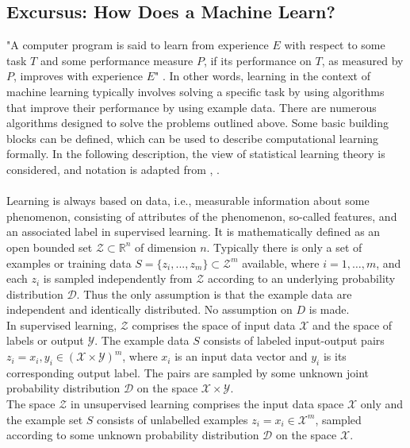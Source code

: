 \begin{tcolorbox}
    \subsection*{Excursus: How Does a Machine Learn?}
    "A computer program is said to learn from experience $E$ with respect to some task $T$ and some performance measure $P$, if its performance on $T$, as measured by $P$, improves with experience $E$" \cite{Mitchell1997}. In other words, learning in the context of machine learning typically involves solving a specific task by using algorithms that improve their performance by using example data. There are numerous algorithms designed to solve the problems outlined above. Some basic building blocks can be defined, which can be used to describe computational learning formally. In the following description, the view of statistical learning theory is considered, and notation is adapted from \citeauthor{Shalev2014} \cite{Shalev2014}, \citeauthor{Von_luxburg2011} \cite{Von_luxburg2011}.\\
    \\
    Learning is always based on data, i.e., measurable information about some phenomenon, consisting of attributes of the phenomenon, so-called features, and an associated label in supervised learning. It is mathematically defined as an open bounded set $\mathcal{Z}\subset\mathbb{R}^n$ of dimension $n$. Typically there is only a set of examples or training data $S=\{z_i,...,z_m\}\subset{\mathcal{Z}}^m$ available, where $i = 1,\dots,m$, and each $z_i$ is sampled independently from $\mathcal{Z}$ according to an underlying probability distribution $\mathcal{D}$. Thus the only assumption is that the example data are independent and identically distributed. No assumption on $D$ is made.\\
    In supervised learning, $\mathcal{Z}$ comprises the space of input data $\mathcal{X}$ and the space of labels or output $\mathcal{Y}$. The example data $S$ consists of labeled input-output pairs $z_i=x_i,y_i\in(\mathcal{X}\times\mathcal{Y})^m$, where $x_i$ is an input data vector and $y_i$ is its corresponding output label. The pairs are sampled by some unknown joint probability distribution $\mathcal{D}$ on the space $\mathcal{X}\times\mathcal{Y}$.\\
    The space $\mathcal{Z}$ in unsupervised learning comprises the input data space $\mathcal{X}$ only and the example set $S$ consists of unlabelled examples $z_i=x_i\in\mathcal{X}^m$, sampled according to some unknown probability distribution $\mathcal{D}$ on the space $\mathcal{X}$.\\

\end{tcolorbox}
